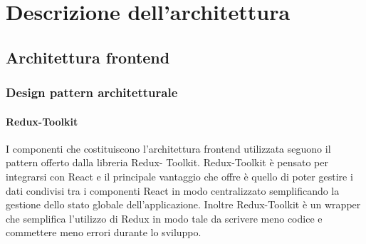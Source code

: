 \section{Descrizione dell'architettura}
\subsection{Architettura frontend}
\subsubsection{Design pattern architetturale}

\paragraph{Redux-Toolkit}
I componenti che costituiscono l’architettura frontend utilizzata seguono il pattern offerto dalla libreria Redux-
Toolkit.
Redux-Toolkit è pensato per integrarsi con React e il principale vantaggio che offre è quello di poter
gestire i dati condivisi tra i componenti React in modo centralizzato semplificando la gestione dello stato
globale dell’applicazione.
Inoltre Redux-Toolkit è un wrapper che semplifica l'utilizzo di Redux in modo tale da scrivere meno codice e commettere meno errori durante lo sviluppo.

